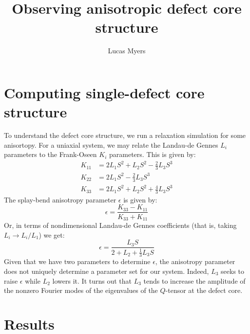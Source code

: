 \documentclass[reqno]{article}
\begin{document}
\title{Observing anisotropic defect core structure}
\author{Lucas Myers}
\maketitle

\section{Computing single-defect core structure}
To understand the defect core structure, we run a relaxation simulation for some anisortopy.
For a uniaxial system, we may relate the Landau-de Gennes $L_i$ parameters to the Frank-Oseen $K_i$ parameters.
This is given by:
\begin{align}
    K_{11} &= 2 L_1 S^2 + L_2 S^2 - \tfrac23 L_3 S^3 \\
    K_{22} &= 2 L_1 S^2 - \tfrac23 L_3 S^3 \\
    K_{33} &= 2 L_1 S^2 + L_2 S^2 + \tfrac43 L_3 S^3
\end{align}
The splay-bend anisotropy parameter $\epsilon$ is given by:
\begin{equation}
    \epsilon 
    =
    \frac{K_{33} - K_{11}}{K_{33} + K_{11}}
\end{equation}
Or, in terms of nondimensional Landau-de Gennes coefficients (that is, taking $L_i \to L_i / L_1$) we get:
\begin{equation}
    \epsilon
    =
    \frac{L_3 S}{2 + L_2 + \tfrac13 L_3 S}
\end{equation}
Given that we have two parameters to determine $\epsilon$, the anisotropy parameter does not uniquely determine a parameter set for our system.
Indeed, $L_3$ seeks to raise $\epsilon$ while $L_2$ lowers it.
It turns out that $L_3$ tends to increase the amplitude of the nonzero Fourier modes of the eigenvalues of the $Q$-tensor at the defect core.

\section{Results}
\end{document}
